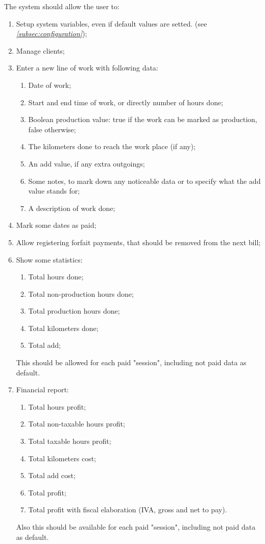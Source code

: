 The system should allow the user to:
\begin{enumerate}[label=(\alph*)]
\item Setup system variables, even if default values are setted. (see \textit{\ref{subsec:configuration}});
\item Manage clients;
\item Enter a new line of work with following data: 
\begin{enumerate}[label=\arabic*)]
\item Date of work;
\item Start and end time of work, or directly number of hours done;
\item Boolean production value: true if the work can be marked as production, false otherwise;
\item The kilometers done to reach the work place (if any);
\item An add value, if any extra outgoings;
\item Some notes, to mark down any noticeable data or to specify what the add value stands for;
\item A description of work done;
\end{enumerate}
\item Mark some dates as paid;
\item Allow registering forfait payments, that should be removed from the next bill;
\item Show some statistics:
\begin{enumerate}[label=\arabic*)]
\item Total hours done;
\item Total non-production hours done;
\item Total production hours done;
\item Total kilometers done;
\item Total add;
\end{enumerate}
This should be allowed for each paid "session", including not paid data as default.
\item Financial report:
\begin{enumerate}[label=\arabic*)]
\item Total hours profit;
\item Total non-taxable hours profit;
\item Total taxable hours profit;
\item Total kilometers cost;
\item Total add cost;
\item Total profit;
\item Total profit with fiscal elaboration (IVA, gross and net to pay). 
\end{enumerate}
Also this should be available for each paid "session", including not paid data as default.
\end{enumerate}

